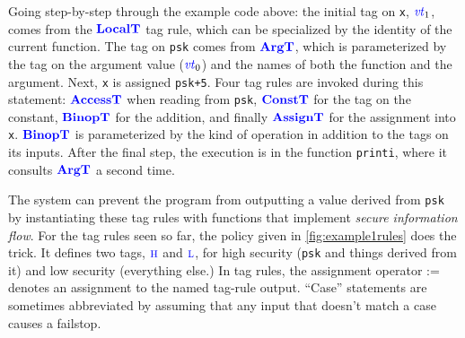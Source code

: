 \documentclass{llncs}
\begin{document}

Going step-by-step through the example code above: 
the initial tag on {\tt x}, \(\mathit{\color{blue} vt}_1\), comes from the \(\color{blue} \mathbf{LocalT}\) tag rule,
which can be specialized by the identity of the current function. The tag on {\tt psk}
comes from \(\color{blue} \mathbf{ArgT}\), which is parameterized by the tag on the argument value (\(\mathit{\color{blue} vt}_0\)) and
the names of both the function and the argument. Next, {\tt x} is assigned {\tt psk+5}.
Four tag rules are invoked during this statement: \(\color{blue} \mathbf{AccessT}\) when reading
from {\tt psk}, \(\color{blue} \mathbf{ConstT}\) for the tag on the constant, \(\color{blue} \mathbf{BinopT}\) for the addition,
and finally \(\color{blue} \mathbf{AssignT}\) for the assignment into {\tt x}. \(\color{blue} \mathbf{BinopT}\) is parameterized
by the kind of operation in addition to the tags on its inputs.
After the final step, the execution is in the function {\tt printi}, where it consults
\(\color{blue} \mathbf{ArgT}\) a second time.

The system can prevent the program from outputting a value derived from {\tt psk} by instantiating these tag rules with
functions that implement {\em secure information flow}. For the tag rules seen so far, the policy given in
\cref{fig:example1rules} does the trick. It defines two tags, \(\textnormal{\color{blue} \sc h}\) and \(\textnormal{\color{blue} \sc l}\), for high
security ({\tt psk} and things derived from it) and low security (everything else.) In tag rules,
the assignment operator := denotes an assignment to the named tag-rule output. 
``Case'' statements are sometimes abbreviated by assuming that any input that doesn't match a case causes a failstop.
\end{document}
